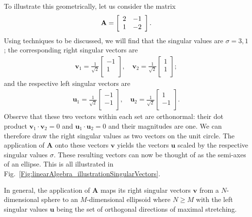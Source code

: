 To illustrate this geometrically, let us consider the matrix
\begin{align}
  \mathbf{A} = \left[ \begin{array}{c c}
   2 & -1 \\
   1 & -2 \\ \end{array} \right] . \nonumber
\end{align}
Using techniques to be discussed, we will find that the singular values are $\sigma = 3, 1$; the corresponding right singular vectors are
\begin{align}
  \mathbf{v}_1 = \frac{1}{\sqrt{2}} \left[ \begin{array}{c} -1 \\ 1 \\ \end{array} \right] , \quad
  \mathbf{v}_2 = \frac{1}{\sqrt{2}} \left[ \begin{array}{c}  1 \\ 1 \\ \end{array} \right] ;
\end{align}
and the respective left singular vectors are
\begin{align}
  \mathbf{u}_1 = \frac{1}{\sqrt{2}} \left[ \begin{array}{c} -1 \\ -1 \\ \end{array} \right] , \quad
  \mathbf{u}_2 = \frac{1}{\sqrt{2}} \left[ \begin{array}{c}  1 \\ -1 \\ \end{array} \right] .
\end{align}
Observe that these two vectors within each set are orthonormal: their dot product $\mathbf{v}_1 \cdot \mathbf{v}_2 = 0$ and $\mathbf{u}_1 \cdot \mathbf{u}_2 = 0$  and their magnitudes are one. We can therefore draw the right singular values as two vectors on the unit circle. The application of $\mathbf{A}$ onto these vectors $\mathbf{v}$ yields the vectors $\mathbf{u}$ scaled by the respective singular values $\sigma$. These resulting vectors can now be thought of as the semi-axes of an ellipse. This is all illustrated in Fig.~\ref{Fig:linearAlgebra_illustrationSingularVectors}.

In general, the application of $\mathbf{A}$ maps its right singular vectors $\mathbf{v}$ from a $N$-dimensional sphere to an $M$-dimensional ellipsoid where $N \ge M$ with the left singular values $\mathbf{u}$ being the set of orthogonal directions of maximal stretching.

